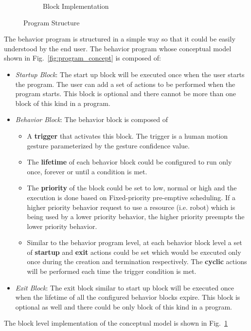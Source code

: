 \documentclass{llncs}
\begin{document}
\begin{figure}
\begin{subfigure}[t]{0.48\textwidth}
\caption[Block Implementation]{Block Implementation}
\label{fig:program_blocks}
\end{subfigure}
\caption[Program Structure]{Program Structure}
\label{fig:program}
\end{figure}
The behavior program is structured in a simple way so that it could be easily understood by the end user. The behavior program whose conceptual model shown in Fig.~\ref{fig:program_concept} is composed of:
\begin{itemize}
\item \emph{Startup Block}: The start up block will be executed once when the user starts the program. The user can add a set of actions to be performed when the program starts. This block is optional and there cannot be more than one block of this kind in a program.
\item \emph{Behavior Block}: The behavior block is composed of
\begin{itemize}
\item A \textbf{trigger} that activates this block. The trigger is a human motion gesture parameterized by the gesture confidence value.
\item The \textbf{lifetime} of each behavior block could be configured to run only once, forever or until a condition is met. 
\item The \textbf{priority} of the block could be set to low, normal or high and the execution is done based on Fixed-priority pre-emptive scheduling. If a higher priority behavior request to use a resource (i.e. robot) which is being used by a lower priority behavior, the higher priority preempts the lower priority behavior.
\item Similar to the behavior program level, at each behavior block level a set of \textbf{startup} and \textbf{exit} actions could be set which would be executed only once during the creation and termination respectively. The \textbf{cyclic} actions will be performed each time the trigger condition is met.
\end{itemize}
\item \emph{Exit Block}: The exit block similar to start up block will be executed once when the lifetime of all the configured behavior blocks expire. This block is optional as well and there could be only block of this kind in a program.
\end{itemize}
The block level implementation of the conceptual model is shown in Fig.~\ref{fig:program_blocks}
\end{document}
